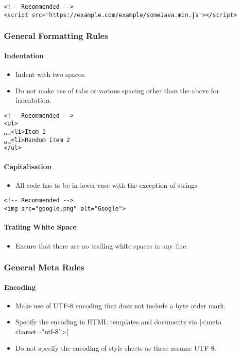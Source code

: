 \documentclass[a4paper, 11pt]{article}
\begin{document}
\begin{verbatim}
<!-- Recommended -->
<script src="https://example.com/example/someJava.min.js"></script>
\end{verbatim}

\subsubsection{General Formatting Rules}

\paragraph{Indentation}
\begin{itemize}
\item Indent with two spaces.
\item Do not make use of tabs or various spacing other than the above for indentation.
\end{itemize}
\begin{verbatim}
<!-- Recommended -->
<ul>
␣␣<li>Item 1
␣␣<li>Random Item 2
</ul>
\end{verbatim}

\paragraph{Capitalisation}
\begin{itemize}
\item All code has to be in lower-case with the exception of strings.
\end{itemize}
\begin{verbatim}
<!-- Recommended -->
<img src="google.png" alt="Google">
\end{verbatim}

\paragraph{Trailing White Space}
\begin{itemize}
\item Ensure that there are no trailing white spaces in any line.
\end{itemize}

\pagebreak

\subsubsection{General Meta Rules}

\paragraph{Encoding}
\begin{itemize}
\item Make use of UTF-8 encoding that does not include a byte order mark.
\item Specify the encoding in HTML templates and documents via |<meta charset="utf-8">|
\item Do not specify the encoding of style sheets as these assume UTF-8.
\end{itemize}
\end{document}
